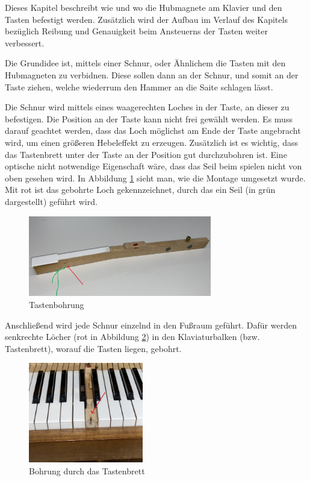 Dieses Kapitel beschreibt wie und wo die Hubmagnete am Klavier und den Tasten befestigt werden.
Zusätzlich wird der Aufbau im Verlauf des Kapitels bezüglich Reibung und Genauigkeit beim Ansteuerns der Tasten weiter verbessert.
\newline

Die Grundidee ist, mittels einer Schnur, oder Ähnlichem die Tasten mit den Hubmagneten zu verbidnen.
Diese sollen dann an der Schnur, und somit an der Taste ziehen, welche wiederrum den Hammer an die Saite schlagen lässt.

Die Schnur wird mittels eines waagerechten Loches in der Taste, an dieser zu befestigen.
Die Position an der Taste kann nicht frei gewählt werden.
Es muss darauf geachtet werden, dass das Loch möglichst am Ende der Taste angebracht wird, um einen größeren Hebeleffekt zu erzeugen.
Zusätzlich ist es wichtig, dass das Tastenbrett unter der Taste an der Position gut durchzubohren ist.
Eine optische nicht notwendige Eigenschaft wäre, dass das Seil beim spielen nicht von oben gesehen wird.
In Abbildung \ref{img:Tastenbohrung} sieht man, wie die Montage umgesetzt wurde.
Mit rot ist das gebohrte Loch gekennzeichnet, durch das ein Seil (in grün dargestellt) geführt wird.

\begin{figure}[htbp]
    \centering
    \includegraphics[width=8cm]{img/Taste_schraeg.jpg}
    \caption{Tastenbohrung}
    \label{img:Tastenbohrung}
\end{figure}


Anschließend wird jede Schnur einzelnd in den Fußraum geführt.
Dafür werden senkrechte Löcher (rot in Abbildung \ref{fig:klaviatur}) in den Klaviaturbalken (bzw. Tastenbrett),
worauf die Tasten liegen, gebohrt.

\begin{figure}[htbp]
    \centering
    \includegraphics[width=5cm]{img/Klaviatur.jpg}
    \caption{Bohrung durch das Tastenbrett}
    \label{fig:klaviatur}
\end{figure}


